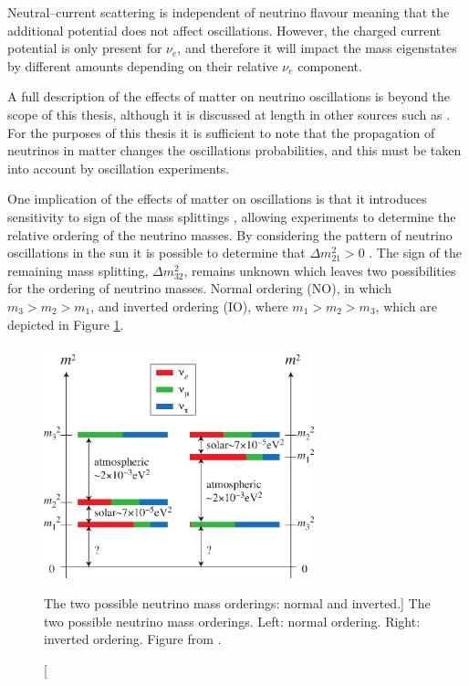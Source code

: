 Neutral--current scattering is independent of neutrino flavour meaning that
the additional potential does not affect oscillations. However, the charged
current potential is only present for $\nu_e$, and therefore it will impact the
mass eigenstates by different amounts depending on their relative $\nu_e$
component.

A full description of the effects of matter on neutrino oscillations is beyond
the scope of this thesis, although it is discussed at length in other sources
such as \cite{GiuntiCarlo2007FoNP}. For the purposes of this thesis it is
sufficient to note that the propagation of neutrinos in matter changes the
oscillations probabilities, and this must be taken into account by oscillation
experiments.

One implication of the effects of matter on oscillations is that it introduces
sensitivity to sign of the mass splittings \cite{GiuntiCarlo2007FoNP}, 
allowing experiments to determine the relative ordering of the neutrino 
masses. By considering the pattern of neutrino oscillations in the sun it is 
possible to determine that $\Delta m_{21}^2 > 0$ \cite{PhysRevD.98.030001}. 
The sign of the remaining mass splitting, $\Delta m_{32}^2$, remains unknown 
which leaves two possibilities for the ordering of neutrino masses. Normal 
ordering (NO), in which $m_3 > m_2 > m_1$, and inverted ordering (IO), where $m_1 > m_2 
> m_3$, which are depicted in Figure \ref{fig:mass_ordering}. 
\begin{figure}
	\centering
	\includegraphics[width=0.7\textwidth]{figures/mass.pdf}
	\caption
	[The two possible neutrino mass orderings: normal and inverted.]
	{The two possible neutrino mass orderings. Left: normal ordering. Right: inverted ordering. 
	Figure from \cite{SKing}.}
	\label{fig:mass_ordering}
\end{figure}

